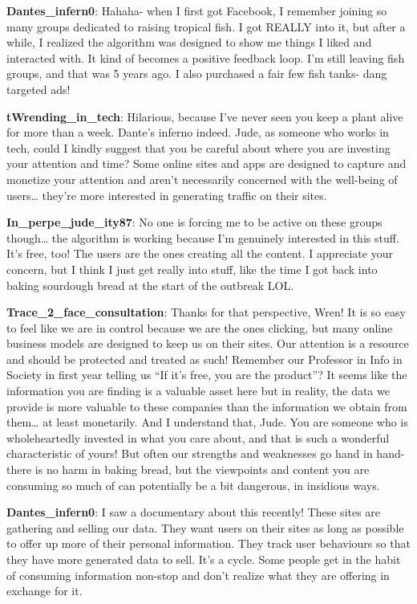 \documentclass[
  letterpaper,
  DIV=11,
  numbers=noendperiod]{scrreprt}
\begin{document}
\textbf{Dantes\_infern0}: Hahaha- when I first got Facebook, I remember
joining so many groups dedicated to raising tropical fish. I got REALLY
into it, but after a while, I realized the algorithm was designed to
show me things I liked and interacted with. It kind of becomes a
positive feedback loop. I'm still leaving fish groups, and that was 5
years ago. I also purchased a fair few fish tanks- dang targeted ads!

\textbf{tWrending\_in\_tech}: Hilarious, because I've never seen you
keep a plant alive for more than a week. Dante's inferno indeed. Jude,
as someone who works in tech, could I kindly suggest that you be careful
about where you are investing your attention and time? Some online sites
and apps are designed to capture and monetize your attention and aren't
necessarily concerned with the well-being of users\ldots{} they're more
interested in generating traffic on their sites.

\textbf{In\_perpe\_jude\_ity87}: No one is forcing me to be active on
these groups though\ldots{} the algorithm is working because I'm
genuinely interested in this stuff. It's free, too! The users are the
ones creating all the content. I appreciate your concern, but I think I
just get really into stuff, like the time I got back into baking
sourdough bread at the start of the outbreak LOL.

\textbf{Trace\_2\_face\_consultation}: Thanks for that perspective,
Wren! It is so easy to feel like we are in control because we are the
ones clicking, but many online business models are designed to keep us
on their sites. Our attention is a resource and should be protected and
treated as such! Remember our Professor in Info in Society in first year
telling us ``If it's free, you are the product''? It seems like the
information you are finding is a valuable asset here but in reality, the
data we provide is more valuable to these companies than the information
we obtain from them\ldots{} at least monetarily. And I understand that,
Jude. You are someone who is wholeheartedly invested in what you care
about, and that is such a wonderful characteristic of yours! But often
our strengths and weaknesses go hand in hand- there is no harm in baking
bread, but the viewpoints and content you are consuming so much of can
potentially be a bit dangerous, in insidious ways.

\textbf{Dantes\_infern0}: I saw a documentary about this recently! These
sites are gathering and selling our data. They want users on their sites
as long as possible to offer up more of their personal information. They
track user behaviours so that they have more generated data to sell.
It's a cycle. Some people get in the habit of consuming information
non-stop and don't realize what they are offering in exchange for it.
\end{document}
